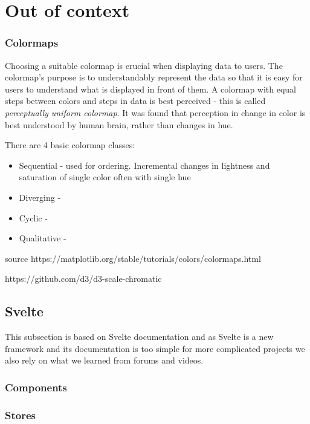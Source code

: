 \chapter{Out of context}

\subsection{Colormaps}

Choosing a suitable colormap is crucial when displaying data to users. The colormap's purpose is to understandably represent the data so that it is easy for users to understand what is displayed in front of them. A colormap with equal steps between colors and steps in data is best perceived - this is called \textit{perceptually uniform colormap}. It was found that perception in change in color is best understood by human brain, rather than changes in hue. 

There are 4 basic colormap classes:

\begin{itemize}
    \item Sequential - used for ordering. Incremental changes in lightness and saturation of single color often with single hue
    \item Diverging - 
    \item Cyclic - 
    \item Qualitative - 
\end{itemize}
source https://matplotlib.org/stable/tutorials/colors/colormaps.html

https://github.com/d3/d3-scale-chromatic



\section{Svelte}



This subsection is based on Svelte documentation\cite{sveltedoc} and as Svelte is a new framework and its documentation is too simple for more complicated projects we also rely on what we learned from forums and videos.

\subsection{Components}

\subsection{Stores}

